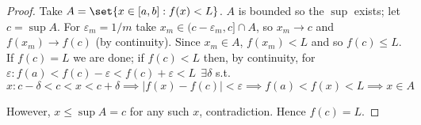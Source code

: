 \documentclass{article}
\begin{document}
\begin{proof}
  Take $A = \set{x \in [a, b]: f(x) < L}$. $A$ is bounded so the $\sup$ exists; let $c = \sup A$. For $\varepsilon_m = 1/m$ take $x_m \in (c - \varepsilon_m, c] \cap A$, so $x_m \to c$ and $f(x_m) \to f(c)$ (by continuity). Since $x_m \in A$, $f(x_m) < L$ and so $f(c) \le L$. If $f(c) = L$ we are done; if $f(c) < L$ then, by continuity, for $\varepsilon: f(a) < f(c) - \varepsilon < f(c) + \varepsilon < L ~~ \exists \delta$ s.t.
  \[
    x: c - \delta < c < x < c + \delta
    \implies
    |f(x) - f(c)| < \varepsilon
    \implies
    f(a) < f(x) < L
    \implies
    x \in A
  \]

  However, $x \le \sup A = c$ for any such $x$, contradiction. Hence $f(c) = L$.
\end{proof}

\clearpage
\printindex

\end{document}
